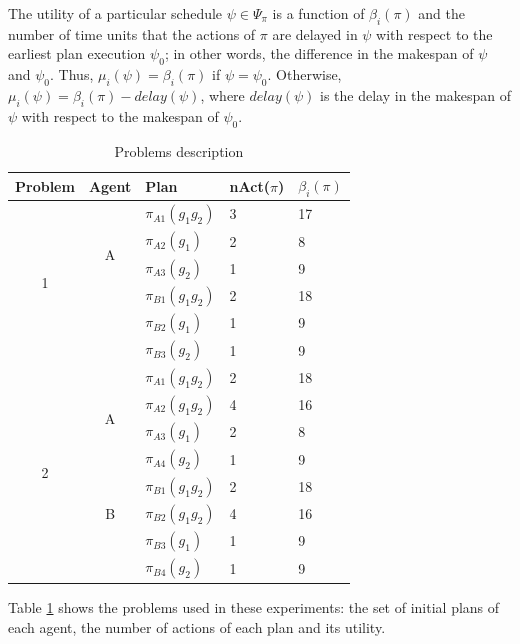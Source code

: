 \documentclass[letterpaper]{article}
\begin{document}
The utility of a particular schedule $\psi \in \Psi_{\pi}$ is a function of $\beta_i(\pi)$ and the number of time units that the actions of $\pi$ are delayed in $\psi$ with respect to the earliest plan execution $\psi_0$; in other words, the difference in the makespan of $\psi$ and $\psi_0$. Thus, $\mu_i(\psi)=\beta_i(\pi)$ if $\psi = \psi_0$. Otherwise, $\mu_i(\psi)=\beta_i(\pi)- delay(\psi)$, where $delay(\psi)$ is the delay in the makespan of $\psi$ with respect to the makespan of $\psi_0$.


\begin{table}[ht]
\centering \footnotesize
\begin{tabular}{|c|c|l|l|l|}
 \hline
 Problem & Agent  & Plan & nAct($\pi$) & $\beta_i(\pi)$ \\ \hline

\multirow{6}{*}{1} & \multirow{4}{*}{A} &  $\pi_{A1}(g_1g_2)$ & 3 &  17  \\
 & &   $\pi_{A2}(g_1)$ & 2 & 8 \\
 & &   $\pi_{A3}(g_2)$ & 1 & 9 \\  \cline{2-5}
 & \multirow{3}{*}{B} &  $\pi_{B1}(g_1g_2)$ & 2 &  18  \\
 & &  $\pi_{B2}(g_1)$ & 1 & 9 \\
 & & $\pi_{B3}(g_2)$ & 1 & 9 \\

 \hline \hline

 \multirow{8}{*}{2} & \multirow{4}{*}{A} &  $\pi_{A1}(g_1g_2)$ & 2 &  18  \\
 & &  $\pi_{A2}(g_1g_2)$ & 4 & 16 \\
 & &   $\pi_{A3}(g_1)$ & 2 & 8 \\
 & &   $\pi_{A4}(g_2)$ & 1 & 9 \\  \cline{2-5}
 & \multirow{3}{*}{B} &  $\pi_{B1}(g_1g_2)$ & 2 &  18  \\
 & &  $\pi_{B2}(g_1g_2)$ & 4 & 16 \\
 & &  $\pi_{B3}(g_1)$ & 1 & 9 \\
 & & $\pi_{B4}(g_2)$ & 1 & 9 \\ \hline

 \end{tabular}
\caption{Problems description}
\label{tab:setup}
\end{table}

Table \ref{tab:setup} shows the problems used in these experiments: the set of initial plans of each agent, the number of actions of each plan and its utility.
\end{document}
